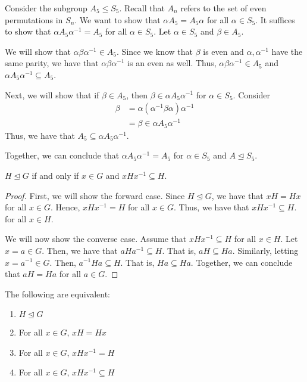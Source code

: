 \begin{nexample}
    Consider the subgroup \(A_5 \leq S_5\). Recall that \(A_n\) refers to the set of even permutations in \(S_n\). We want to show that \(\alpha A_5 = A_5 \alpha\) for all \(\alpha \in S_5\). It suffices to show that \(\alpha A_5 \alpha^{-1} = A_5\) for all \(\alpha \in S_5\). Let \(\alpha \in S_5\) and \(\beta \in A_5\).

    We will show that \(\alpha \beta \alpha^{-1} \in A_5\). Since we know that \(\beta\) is even and \(\alpha, \alpha^{-1}\) have the same parity, we have that \(\alpha \beta \alpha^{-1}\) is an even as well. Thus, \(\alpha \beta \alpha^{-1} \in A_5\) and \(\alpha A_5 \alpha^{-1} \subseteq A_5\).

    Next, we will show that if \(\beta \in A_5\), then \(\beta \in \alpha A_5 \alpha^{-1}\) for \(\alpha \in S_5\). Consider
\[
\begin{aligned}
    \beta &= \alpha(\alpha^{-1} \beta \alpha)\alpha^{-1} \\
          &= \beta \in \alpha A_5 \alpha^{-1}
\end{aligned}
\]
Thus, we have that \(A_5 \subseteq \alpha A_5 \alpha^{-1}\).

Together, we can conclude that \(\alpha A_5 \alpha^{-1} = A_5\) for \(\alpha \in S_5\) and \(A \unlhd S_5\).
\end{nexample}

\begin{theorem}
    \(H \unlhd G\) if and only if \(x \in G\) and \(xHx^{-1} \subseteq H\).
\end{theorem}

\begin{proof}
    First, we will show the forward case. Since \(H \unlhd G\), we have that \(xH = Hx\) for all \(x \in G\). Hence, \(x H x^{-1} = H\) for all \(x \in G\). Thus, we have that \(x H x^{-1} \subseteq H\). for all \(x \in H\).

    We will now show the converse case. Assume that \(xHx^{-1} \subseteq H\) for all \(x \in H\). Let \(x = a \in G\). Then, we have that \(aHa^{-1} \subseteq H\). That is, \(aH \subseteq Ha\). Similarly, letting \(x = a^{-1} \in G\). Then, \(a^{-1}Ha \subseteq H\). That is, \(Ha \subseteq Ha\). Together, we can conclude that \(aH = Ha\) for all \(a \in G\).
\end{proof}

\begin{remark}
    The following are equivalent:
    \begin{enumerate}
        \item \(H \unlhd G\)
        \item For all \(x \in G\), \(xH = Hx\)
        \item For all \(x \in G\), \(xHx^{-1} = H\)
        \item For all \(x \in G\), \(xHx^{-1} \subseteq H\)
    \end{enumerate}
\end{remark}

